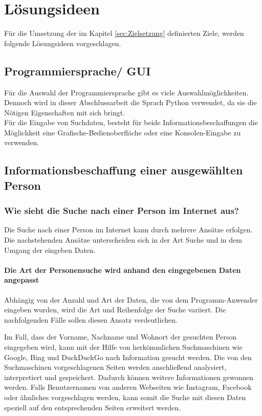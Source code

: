
\chapter{Lösungsideen}  %
\label{cha:Lösungsideen} %
Für die Umsetzung der im Kapitel \ref{sec:Zielsetzung} definierten Ziele, werden folgende Lösungsideen vorgeschlagen.

\section{Programmiersprache/ GUI}
Für die Auswahl der Programmiersprache gibt es viele Auswahlmöglichkeiten. Dennoch wird in dieser Abschlussarbeit die Sprach Python verwendet, da sie die Nötigen Eigenschaften mit sich bringt.\\
Für die Eingabe von Suchdaten, besteht für beide Informationsbeschaffungen die Möglichkeit eine Grafische-Bedienoberfläche oder eine Konsolen-Eingabe zu verwenden.
\section{Informationsbeschaffung einer ausgewählten Person}	
	\subsection{Wie sieht die Suche nach einer Person im Internet aus?}
	\label{sec:Suche nach Information}
	Die Suche nach einer Person im Internet kann durch mehrere Ansätze erfolgen. Die nachstehenden Ansätze unterscheiden sich in der Art Suche und in dem Umgang der eingeben Daten.
		\subsubsection{Die Art der Personensuche wird anhand den eingegebenen Daten angepasst}
		\label{subsubsec: DieArtderPersonensuchewirdanhanddeneingegebenenDaten angepasst}
		Abhängig von der Anzahl und Art der Daten, die von dem Programm-Anwender eingeben wurden, wird die Art und Reihenfolge der Suche variiert. Die nachfolgenden Fälle sollen diesen Ansatz verdeutlichen.
		
		Im Fall, dass der Vorname, Nachname und Wohnort der gesuchten Person eingegeben wird, kann mit der Hilfe von herkömmlichen Suchmaschinen wie Google, Bing und DuckDuckGo nach Information gesucht werden. Die von den Suchmaschinen vorgeschlagenen Seiten werden anschließend analysiert, interpretiert und gespeichert. Dadurch können weitere Informationen gewonnen werden. Falls Benutzernamen von anderen Webseiten wie Instagram, Facebook oder ähnliches vorgeschlagen werden, kann somit die Suche mit diesen Daten speziell auf den entsprechenden Seiten erweitert werden.
		
